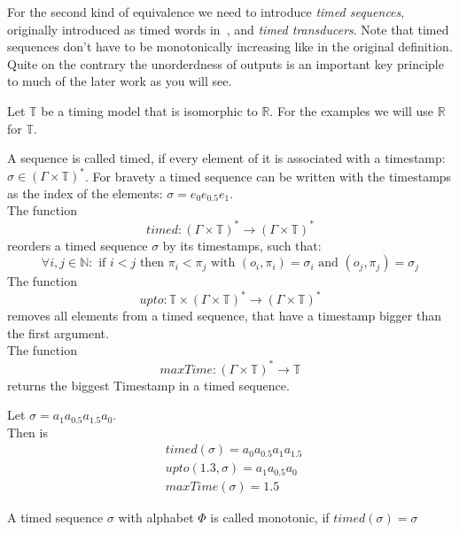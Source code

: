 For the second kind of equivalence we need to introduce \emph{timed sequences}, originally introduced as timed words in~\cite{Alur1994}, and \emph{timed transducers}.
Note that timed sequences don't have to be monotonically increasing like in the original definition.
Quite on the contrary the unorderdness of outputs is an important key principle to much of the later work as you will see.

Let \(\mathbb{T}\) be a timing model that is isomorphic to \(\mathbb{R}\).
For the examples we will use \(\mathbb{R}\) for \(\mathbb{T}\).

\begin{definition}[name = Timed Sequence]\label{def:timed_sequence}
  A sequence is called timed, if every element of it is associated with a timestamp: \(\sigma \in {(\Gamma\times\mathbb{T})}^*\).
  For bravety a timed sequence can be written with the timestamps as the index of the elements: \(\sigma = e_0e_{0.5}e_1 \).\\
  The function
  \[\mathit{timed: } {(\Gamma \times \mathbb{T})}^* \rightarrow {(\Gamma \times \mathbb{T})}^* \]
  reorders a timed sequence \(\sigma\) by its timestamps, such that:
  \[ \forall i,j \in \mathbb{N}:\text{ if } i < j \text{ then } \pi_i < \pi_j \text{ with } (o_i, \pi_i) = \sigma_i \text{ and } (o_j, \pi_j) = \sigma_j \]
  The function
  \[\mathit{upto: } \mathbb{T} \times {(\Gamma\times\mathbb{T})}^* \rightarrow {(\Gamma\times\mathbb{T})}^*\]
  removes all elements from a timed sequence, that have a timestamp bigger than the first argument.\\
  The function
  \[\mathit{maxTime: } {(\Gamma\times\mathbb{T})}^* \rightarrow \mathbb{T} \]
  returns the biggest Timestamp in a timed sequence.
\end{definition}

\begin{exmp}[name=Functions on Timed Sequences]
Let \(\sigma = a_1a_{0.5}a_{1.5}a_0\).\\
  Then is
    \begin{align*}
      &\mathit{timed} (\sigma) = a_0a_{0.5}a_1a_{1.5}\ \\
      &\mathit{upto} (1.3,\sigma) = a_1a_{0.5}a_0 \\
      &\mathit{maxTime} (\sigma) = 1.5
    \end{align*}
\end{exmp}

\begin{definition}[name = Monotonicity of Timed Sequences]\label{def:monotonicity_timed_sequences}
  A timed sequence \(\sigma\) with alphabet \(\Phi\) is called monotonic,
  if \( \mathit{timed}(\sigma) = \sigma\)
\end{definition}

